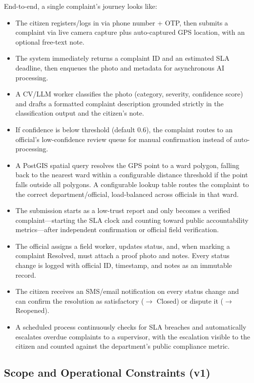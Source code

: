 \documentclass[12pt,a4paper]{article}
\begin{document}
End-to-end, a single complaint's journey looks like:
\begin{itemize}
    \item The citizen registers/logs in via phone number + OTP, then submits a complaint via live camera capture plus auto-captured GPS location, with an optional free-text note.
    \item The system immediately returns a complaint ID and an estimated SLA deadline, then enqueues the photo and metadata for asynchronous AI processing.
    \item A CV/LLM worker classifies the photo (category, severity, confidence score) and drafts a formatted complaint description grounded strictly in the classification output and the citizen's note.
    \item If confidence is below threshold (default 0.6), the complaint routes to an official's low-confidence review queue for manual confirmation instead of auto-processing.
    \item A PostGIS spatial query resolves the GPS point to a ward polygon, falling back to the nearest ward within a configurable distance threshold if the point falls outside all polygons. A configurable lookup table routes the complaint to the correct department/official, load-balanced across officials in that ward.
    \item The submission starts as a low-trust report and only becomes a verified complaint---starting the SLA clock and counting toward public accountability metrics---after independent confirmation or official field verification.
    \item The official assigns a field worker, updates status, and, when marking a complaint Resolved, must attach a proof photo and notes. Every status change is logged with official ID, timestamp, and notes as an immutable record.
    \item The citizen receives an SMS/email notification on every status change and can confirm the resolution as satisfactory ($\rightarrow$ Closed) or dispute it ($\rightarrow$ Reopened).
    \item A scheduled process continuously checks for SLA breaches and automatically escalates overdue complaints to a supervisor, with the escalation visible to the citizen and counted against the department's public compliance metric.
\end{itemize}

\subsection{Scope and Operational Constraints (v1)}
\end{document}
